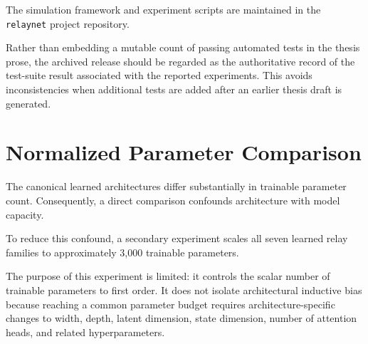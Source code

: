 The simulation framework and experiment scripts are maintained in the
\texttt{relaynet} project repository.

Rather than embedding a mutable count of passing automated tests in the
thesis prose, the archived release should be regarded as the
authoritative record of the test-suite result associated with the
reported experiments. This avoids inconsistencies when additional
tests are added after an earlier thesis draft is generated.


\section{Normalized Parameter Comparison}
\label{sec:normalized-parameter-comparison}

The canonical learned architectures differ substantially in trainable
parameter count. Consequently, a direct comparison confounds
architecture with model capacity.

To reduce this confound, a secondary experiment scales all seven
learned relay families to approximately 3,000 trainable parameters.

The purpose of this experiment is limited: it controls the scalar
number of trainable parameters to first order. It does not isolate
architectural inductive bias because reaching a common parameter
budget requires architecture-specific changes to width, depth, latent
dimension, state dimension, number of attention heads, and related
hyperparameters.

